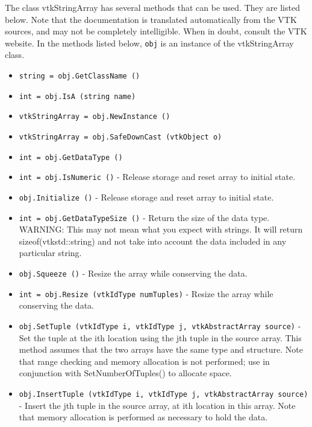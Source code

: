 The class vtkStringArray has several methods that can be used.
  They are listed below.
Note that the documentation is translated automatically from the VTK sources,
and may not be completely intelligible.  When in doubt, consult the VTK website.
In the methods listed below, \verb|obj| is an instance of the vtkStringArray class.
\begin{itemize}
\item  \verb|string = obj.GetClassName ()|

\item  \verb|int = obj.IsA (string name)|

\item  \verb|vtkStringArray = obj.NewInstance ()|

\item  \verb|vtkStringArray = obj.SafeDownCast (vtkObject o)|

\item  \verb|int = obj.GetDataType ()|

\item  \verb|int = obj.IsNumeric ()| -  Release storage and reset array to initial state.

\item  \verb|obj.Initialize ()| -  Release storage and reset array to initial state.

\item  \verb|int = obj.GetDataTypeSize ()| -  Return the size of the data type.  WARNING: This may not mean
 what you expect with strings.  It will return
 sizeof(vtkstd::string) and not take into account the data
 included in any particular string.

\item  \verb|obj.Squeeze ()| -  Resize the array while conserving the data.

\item  \verb|int = obj.Resize (vtkIdType numTuples)| -  Resize the array while conserving the data.

\item  \verb|obj.SetTuple (vtkIdType i, vtkIdType j, vtkAbstractArray source)| -  Set the tuple at the ith location using the jth tuple in the source array.
 This method assumes that the two arrays have the same type
 and structure. Note that range checking and memory allocation is not 
 performed; use in conjunction with SetNumberOfTuples() to allocate space.

\item  \verb|obj.InsertTuple (vtkIdType i, vtkIdType j, vtkAbstractArray source)| -  Insert the jth tuple in the source array, at ith location in this array. 
 Note that memory allocation is performed as necessary to hold the data.


\end{itemize}

